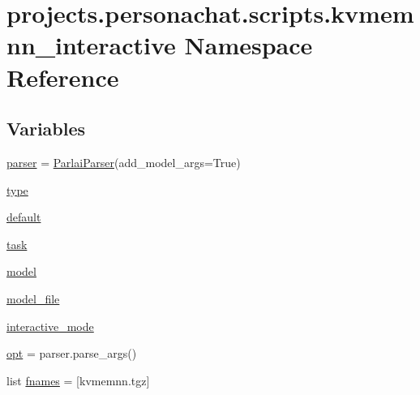 \hypertarget{namespaceprojects_1_1personachat_1_1scripts_1_1kvmemnn__interactive}{}\section{projects.\+personachat.\+scripts.\+kvmemnn\+\_\+interactive Namespace Reference}
\label{namespaceprojects_1_1personachat_1_1scripts_1_1kvmemnn__interactive}
\subsection*{Variables}
\begin{DoxyCompactItemize}
\item 
\hyperlink{namespaceprojects_1_1personachat_1_1scripts_1_1kvmemnn__interactive_aa6bd5f5f1d91f5e7edc9da941b6de0a3}{parser} = \hyperlink{classparlai_1_1core_1_1params_1_1ParlaiParser}{Parlai\+Parser}(add\+\_\+model\+\_\+args=True)
\item 
\hyperlink{namespaceprojects_1_1personachat_1_1scripts_1_1kvmemnn__interactive_a25e48e7bed4c9d56601844942f2afa61}{type}
\item 
\hyperlink{namespaceprojects_1_1personachat_1_1scripts_1_1kvmemnn__interactive_a84b81c4d7eeffba8f346ef0bb317226f}{default}
\item 
\hyperlink{namespaceprojects_1_1personachat_1_1scripts_1_1kvmemnn__interactive_a05b142cd24f6960a62f280228e0d9f42}{task}
\item 
\hyperlink{namespaceprojects_1_1personachat_1_1scripts_1_1kvmemnn__interactive_a09adc68544b10da3ae5f69b2a98d1f23}{model}
\item 
\hyperlink{namespaceprojects_1_1personachat_1_1scripts_1_1kvmemnn__interactive_a24769b16f270ac6c8db28bb21925812b}{model\+\_\+file}
\item 
\hyperlink{namespaceprojects_1_1personachat_1_1scripts_1_1kvmemnn__interactive_aa01100f1a72819cb5a2d75b4c33084a3}{interactive\+\_\+mode}
\item 
\hyperlink{namespaceprojects_1_1personachat_1_1scripts_1_1kvmemnn__interactive_ab484b07bfdf7096326f2d79a4ee1b258}{opt} = parser.\+parse\+\_\+args()
\item 
list \hyperlink{namespaceprojects_1_1personachat_1_1scripts_1_1kvmemnn__interactive_abb55961ae76d83cf721646de3755ceb8}{fnames} = \mbox{[}\textquotesingle{}kvmemnn.\+tgz\textquotesingle{}\mbox{]}
\end{DoxyCompactItemize}


